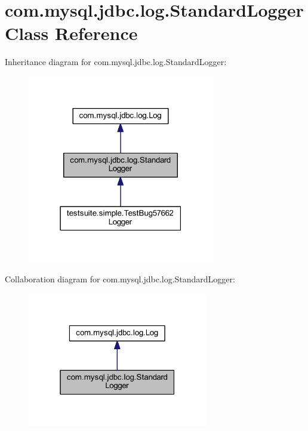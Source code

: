 \hypertarget{classcom_1_1mysql_1_1jdbc_1_1log_1_1_standard_logger}{}\section{com.\+mysql.\+jdbc.\+log.\+Standard\+Logger Class Reference}
\label{classcom_1_1mysql_1_1jdbc_1_1log_1_1_standard_logger}


Inheritance diagram for com.\+mysql.\+jdbc.\+log.\+Standard\+Logger\+:
\nopagebreak
\begin{figure}[H]
\begin{center}
\leavevmode
\includegraphics[width=231pt]{classcom_1_1mysql_1_1jdbc_1_1log_1_1_standard_logger__inherit__graph}
\end{center}
\end{figure}


Collaboration diagram for com.\+mysql.\+jdbc.\+log.\+Standard\+Logger\+:
\nopagebreak
\begin{figure}[H]
\begin{center}
\leavevmode
\includegraphics[width=223pt]{classcom_1_1mysql_1_1jdbc_1_1log_1_1_standard_logger__coll__graph}
\end{center}
\end{figure}

